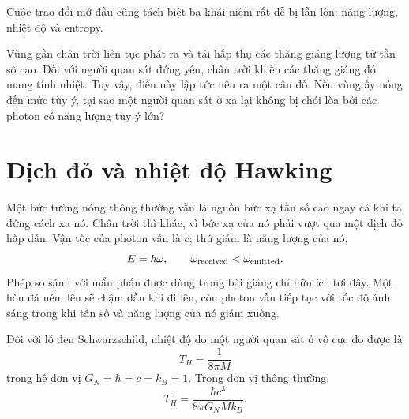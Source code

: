 Cuộc trao đổi mở đầu cũng tách biệt ba khái niệm rất dễ bị lẫn lộn: năng lượng, nhiệt độ và entropy.

\begin{classroomqa}
\end{classroomqa}


Vùng gần chân trời liên tục phát ra và tái hấp thụ các thăng giáng lượng tử tần số cao. Đối với người quan sát đứng yên, chân trời khiến các thăng giáng đó mang tính nhiệt. Tuy vậy, điều này lập tức nêu ra một câu đố. Nếu vùng ấy nóng đến mức tùy ý, tại sao một người quan sát ở xa lại không bị chói lòa bởi các photon có năng lượng tùy ý lớn?

\section{Dịch đỏ và nhiệt độ Hawking}

Một bức tường nóng thông thường vẫn là nguồn bức xạ tần số cao ngay cả khi ta đứng cách xa nó. Chân trời thì khác, vì bức xạ của nó phải vượt qua một dịch đỏ hấp dẫn. Vận tốc của photon vẫn là \(c\); thứ giảm là năng lượng của nó,
\begin{equation}
E=\hbar\omega,
\qquad
\omega_{\rm received}<\omega_{\rm emitted}.
\end{equation}
Phép so sánh với mẩu phấn được dùng trong bài giảng chỉ hữu ích tới đây. Một hòn đá ném lên sẽ chậm dần khi đi lên, còn photon vẫn tiếp tục với tốc độ ánh sáng trong khi tần số và năng lượng của nó giảm xuống.

Đối với lỗ đen Schwarzschild, nhiệt độ do một người quan sát ở vô cực đo được là
\begin{equation}
T_H=\frac{1}{8\pi M}
\label{eq:l09-hawking-natural}
\end{equation}
trong hệ đơn vị \(G_N=\hbar=c=k_B=1\). Trong đơn vị thông thường,
\begin{equation}
T_H=\frac{\hbar c^3}{8\pi G_N M k_B}.
\label{eq:l09-hawking-full}
\end{equation}

